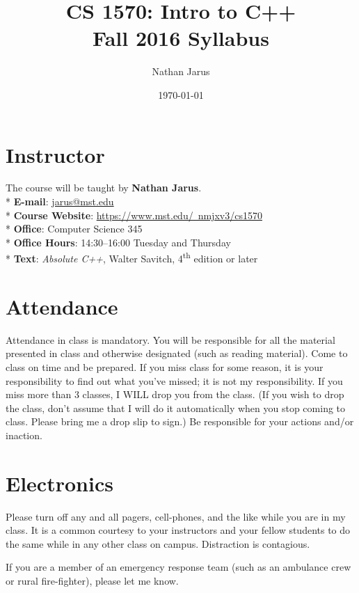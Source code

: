 \documentclass{article}
\title{CS 1570: Intro to C++ \\ Fall 2016 Syllabus}
\date{\today}
\author{Nathan Jarus}
\begin{document}
\maketitle

\section{Instructor}
The course will be taught by \textbf{Nathan Jarus}. \\*
\textbf{E-mail}: \href{mailto:jarus@mst.edu}{jarus@mst.edu} \\*
\textbf{Course Website}: \href{https://www.mst.edu/~nmjxv3/cs1570}{https://www.mst.edu/~nmjxv3/cs1570} \\*
\textbf{Office}: Computer Science 345 \\*
\textbf{Office Hours}: 14:30--16:00 Tuesday and Thursday\\*
\textbf{Text}: \textit{Absolute C++}, Walter Savitch, 4\textsuperscript{th} edition or later\\

\section{Attendance}
Attendance in class is mandatory.
You will be responsible for all the material presented in class and otherwise designated (such as reading material).
Come to class on time and be prepared.
If you miss class for some reason, it is your responsibility to find out what you've missed; it is not my responsibility.
If you miss more than 3 classes, I WILL drop you from the class.
(If you wish to drop the class, don't assume that I will do it automatically when you stop coming to class. Please bring me a drop slip to sign.)
Be responsible for your actions and/or inaction.

\section{Electronics}
Please turn off any and all pagers, cell-phones, and the like while you are in my class.
It is a common courtesy to your instructors and your fellow students to do the same while in any other class on campus.
Distraction is contagious.

If you are a member of an emergency response team (such as an ambulance crew or rural fire-fighter), please let me know.
\end{document}
